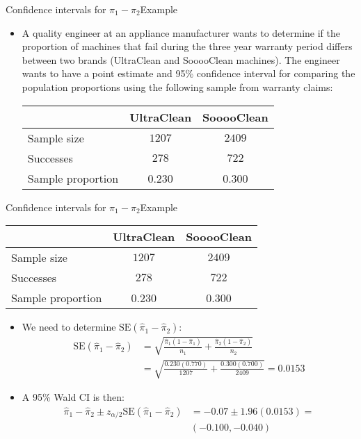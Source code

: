 \documentclass[xcolor=dvipsnames]{beamer}
\begin{document}
\begin{frame}{Confidence intervals for $\pi_1 - \pi_2$}{Example}
	\begin{itemize}
		\item A quality engineer at an appliance manufacturer wants to determine if the proportion of machines that fail during the three year warranty period differs between two brands (UltraClean and SooooClean machines). The engineer wants to have a point estimate and 95\% confidence interval for comparing the population proportions using the following sample from warranty claims:
		\vspace{3mm}
		\begin{center}
			\begin{tabular}{lcc}
				\hline
				& UltraClean & SooooClean \\ \hline
				Sample size & $1207$ & $2409$ \\
				Successes & $278$ & $722$ \\
				Sample proportion & 0.230 & 0.300 \\ \hline
			\end{tabular}
		\end{center}
	\end{itemize}
\end{frame}

\begin{frame}{Confidence intervals for $\pi_1 - \pi_2$}{Example}
	{\tiny
		\begin{center}
			\begin{tabular}{lcc}
				\hline
				& UltraClean & SooooClean \\ \hline
				Sample size & $1207$ & $2409$ \\
				Successes & $278$ & $722$ \\
				Sample proportion & 0.230 & 0.300 \\ \hline
			\end{tabular}
\end{center}}
	\begin{itemize}
		\item We need to determine $\text{SE}(\hat{\pi}_1-\hat{\pi}_2)$: 
		\begin{align*}
		\text{SE}(\hat{\pi}_1-\hat{\pi}_2) &= \sqrt{\frac{\hat{\pi}_1 (1-\hat{\pi}_1)}{n_1}+\frac{\hat{\pi}_2 (1-\hat{\pi}_2)}{n_2}} \\ &=\sqrt{\frac{0.230 (0.770)}{1207}+\frac{0.300 (0.700)}{2409}} = 0.0153
		\end{align*}
		\item A 95\% Wald CI is then:
		\begin{align*}
			\hat{\pi}_1 - \hat{\pi}_2 \pm z_{\alpha/2}\text{SE}(\hat{\pi}_1-\hat{\pi}_2) &= -0.07 \pm 1.96 (0.0153) =\\& (-0.100, -0.040)
		\end{align*}
	\end{itemize}
\end{frame}
\end{document}
